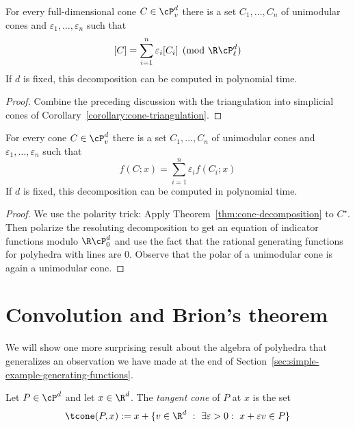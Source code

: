 \begin{theorem}
  \label{thm:cone-decomposition}
  For every full-dimensional cone $C \in \cP_v^d$
  there is a set $C_1, \ldots, C_n$ of unimodular cones
  and $\varepsilon_1, \ldots, \varepsilon_n$ such that
  \[
    [C] = \sum_{i=1}^n \varepsilon_i [C_i] \pmod{\R\cP_\ell^d}
  \]
  If $d$ is fixed, this decomposition can be computed in polynomial time.
\end{theorem}
\begin{proof}
  Combine the preceding discussion with the triangulation into simplicial cones of Corollary~\ref{corollary:cone-triangulation}.
\end{proof}

\begin{corollary}
  \label{corollary:cone-decomposition}
  For every cone $C \in \cP_v^d$
  there is a set $C_1, \ldots, C_n$ of unimodular cones
  and $\varepsilon_1, \ldots, \varepsilon_n$ such that
  \[
    f(C;x) = \sum_{i=1}^n \varepsilon_i f(C_i;x)
  \]
  If $d$ is fixed, this decomposition can be computed in polynomial time.
\end{corollary}
\begin{proof}
  We use the polarity trick:
  Apply Theorem~\ref{thm:cone-decomposition} to $C^\star$.
  Then polarize the resoluting decomposition to get an equation of indicator functions modulo $\R\cP_0^d$
  and use the fact that the rational generating functions for polyhedra with lines are $0$.
  Observe that the polar of a unimodular cone is again a unimodular cone.
\end{proof}






\section{Convolution and Brion's theorem}

We will show one more surprising result about the algebra of polyhedra
that generalizes an observation we have made at the end of Section~\ref{sec:simple-example-generating-functions}.

\begin{definition}
  Let $P \in \cP^d$ and let $x \in \R^d$.
  The \emph{tangent cone} of $P$ at $x$ is the set
  \[
    \tcone(P,x) := x + \{ v \in \R^d ~:~ \exists \varepsilon > 0:~ x + \varepsilon v \in P \}
  \]
\end{definition}

